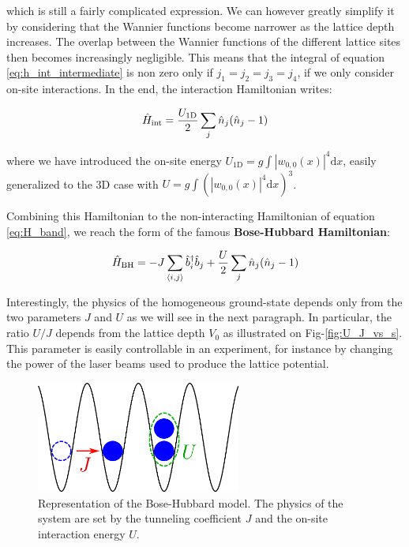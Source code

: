 \noindent which is still a fairly complicated expression. We can however greatly simplify it by considering that the Wannier functions become narrower as the lattice depth increases. The overlap between the Wannier functions of the different lattice sites then becomes increasingly negligible. This means that the integral of equation \ref{eq:h_int_intermediate} is non zero only if $j_1=j_2=j_3=j_4$, \ie if we only consider on-site interactions. In the end, the interaction Hamiltonian writes:

\begin{equation}
    \hat{H}_{\rm{int}}=\frac{U_{\mathrm{1D}}}{2} \sum_j \hat{n}_j (\hat{n}_j -1)
\end{equation}

\noindent where we have introduced the on-site energy $U_{\mathrm{1D}}=g \int\left|w_{0,0}(x)\right|^{4} \mathrm{d}x$, easily generalized to the 3D case with $U=g \int(\left|w_{0,0}(x)\right|^{4} \mathrm{d}x)^3$. 

Combining this Hamiltonian to the non-interacting Hamiltonian of equation \ref{eq:H_band}, we reach the form of the famous \textbf{Bose-Hubbard Hamiltonian}:

\begin{equation}
    \hat{H}_{\mathrm{BH}}= -J \sum_{\left\langle i,j\right\rangle} \hat{b}^{\dagger}_i \hat{b}_j + \frac{U}{2} \sum_j \hat{n}_j (\hat{n}_j -1)
\end{equation}

\noindent Interestingly, the physics of the homogeneous ground-state depends only from the two parameters $J$ and $U$ as we will see in the next paragraph. In particular, the ratio $U/J$ depends from the lattice depth $V_0$ as illustrated on Fig-\ref{fig:U_J_vs_s}. This parameter is easily controllable in an experiment, for instance by changing the power of the laser beams used to produce the lattice potential. 

\begin{figure}
    \centering
    \includegraphics[width=0.6\textwidth]{Fig/Chapter2/illu_bose_hubbard.png}
    \caption{Representation of the Bose-Hubbard model. The physics of the system are set by the tunneling coefficient $J$ and the on-site interaction energy $U$.}
    \label{fig:my_label}
\end{figure}

